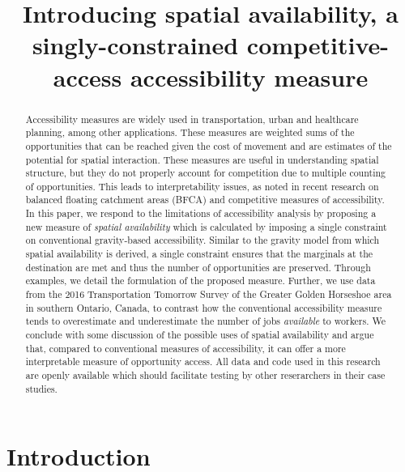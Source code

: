 \documentclass[]{elsarticle} %
\begin{document}
\begin{frontmatter}

  \title{Introducing spatial availability, a singly-constrained
competitive-access accessibility measure}
  
  \begin{abstract}
  Accessibility measures are widely used in transportation, urban and
  healthcare planning, among other applications. These measures are
  weighted sums of the opportunities that can be reached given the cost
  of movement and are estimates of the potential for spatial
  interaction. These measures are useful in understanding spatial
  structure, but they do not properly account for competition due to
  multiple counting of opportunities. This leads to interpretability
  issues, as noted in recent research on balanced floating catchment
  areas (BFCA) and competitive measures of accessibility. In this paper,
  we respond to the limitations of accessibility analysis by proposing a
  new measure of \emph{spatial availability} which is calculated by
  imposing a single constraint on conventional gravity-based
  accessibility. Similar to the gravity model from which spatial
  availability is derived, a single constraint ensures that the
  marginals at the destination are met and thus the number of
  opportunities are preserved. Through examples, we detail the
  formulation of the proposed measure. Further, we use data from the
  2016 Transportation Tomorrow Survey of the Greater Golden Horseshoe
  area in southern Ontario, Canada, to contrast how the conventional
  accessibility measure tends to overestimate and underestimate the
  number of jobs \emph{available} to workers. We conclude with some
  discussion of the possible uses of spatial availability and argue
  that, compared to conventional measures of accessibility, it can offer
  a more interpretable measure of opportunity access. All data and code
  used in this research are openly available which should facilitate
  testing by other reserarchers in their case studies.
  \end{abstract}
  
 \end{frontmatter}

\newpage

\hypertarget{introduction}{%
\section{Introduction}\label{introduction}}
\end{document}
